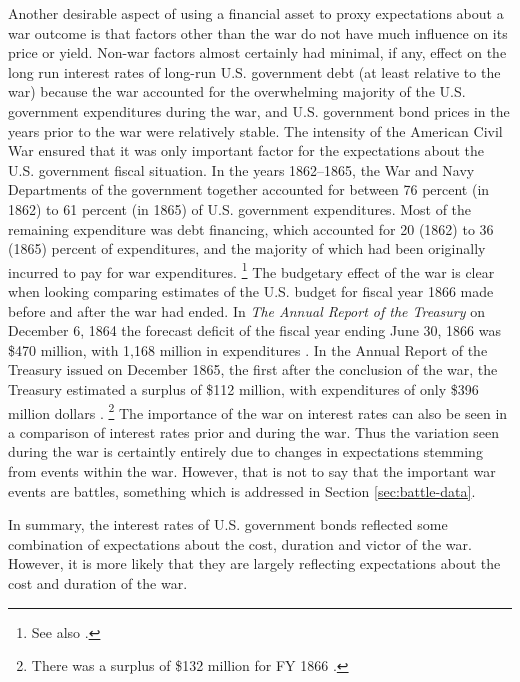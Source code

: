 Another desirable aspect of using a financial asset to proxy expectations about a war outcome is that factors other than the war do not have much influence on its price or yield.
Non-war factors almost certainly had minimal, if any, effect on the long run interest rates of long-run U.S. government debt (at least relative to the war) because the war accounted for the overwhelming majority of the U.S. government expenditures during the war, and U.S. government bond prices in the years prior to the war were relatively stable.
The intensity of the American Civil War ensured that it was only important factor for the expectations about the U.S. government fiscal situation.
In the years 1862--1865, the War and Navy Departments of the government together accounted for between 76 percent (in 1862) to 61 percent (in 1865) of U.S. government expenditures.
Most of the remaining expenditure was debt financing, which accounted for 20 (1862) to 36 (1865) percent of expenditures, and the majority of which had been originally incurred to pay for war expenditures.%
\footnote{See also \textcite[][14]{Godfrey1976}.}
The budgetary effect of the war is clear when looking comparing estimates of the U.S. budget for fiscal year 1866 made before and after the war had ended.
In \textit{The Annual Report of the  Treasury} on December 6, 1864 the forecast deficit of the fiscal year ending June 30, 1866 was \$470 million, with 1,168 million in expenditures \parencite[13][]{Treasury1864}.
In the Annual Report of the Treasury issued on December 1865, the first after the conclusion of the war, the Treasury estimated a surplus of \$112 million, with expenditures of only \$396 million dollars \parencite{Treasury1865}.%
\footnote{There was a surplus of \$132 million for FY 1866 \parencite[2][]{Treasury1866}.}
The importance of the war on interest rates can also be seen in a comparison of interest rates prior and during the war.
Thus the variation seen during the war is certaintly entirely due to changes in expectations stemming from events within the war.
However, that is not to say that the important war events are battles, something which is addressed in Section \ref{sec:battle-data}.

In summary, the interest rates of U.S. government bonds reflected some combination of expectations about the cost, duration and victor of the war.
However, it is more likely that they are largely reflecting expectations about the cost and duration of the war.

